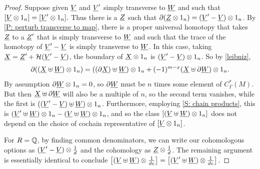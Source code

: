 \begin{proof}
	Suppose given $\underline{V}$ and $\underline{V}'$ simply transverse to $\underline{W}$ and such that $[\underline{V} \otimes 1_n] = [\underline{V}' \otimes 1_n].$
	Thus there is a $\underline{Z}$ such that $\partial (\underline{Z} \otimes 1_n)= (\underline{V}'-\underline{V})\otimes 1_n$.
	By \cref{P: perturb transverse to map}, there is a proper universal homotopy that takes $\underline{Z}$ to a $\underline{Z}'$ that is simply transverse to $\underline{W}$ and such that the trace of the homotopy of $\underline{V}'-\underline{V}$ is simply transverse to $\underline{W}$.
	In this case, taking $\underline{X} = \underline{Z}' + \mathcal{H}(\underline{V}'-\underline{V})$, the boundary of $\underline{X} \otimes 1_n$ is $(\underline{V}'-\underline{V}) \otimes 1_n$.
	So by \cref{leibniz},
	$$\partial ((\underline{X} \uplus \underline{W})\otimes 1_n) = ((\partial \underline{X}) \uplus \underline{W})\otimes 1_n +(-1)^{m-x}(\underline{X} \uplus \partial \underline{W})\otimes 1_n.$$
	By assumption $\partial \underline{W} \otimes 1_n = 0$, so $\partial \underline{W}$ must be $n$ times some element of $C^*_\Gamma(M)$.
	But then $\underline{X} \uplus \partial \underline{W}$ will also be a multiple of $n$, so the second term vanishes, while the first is $((\underline{V}'-\underline{V})\uplus \underline{W}) \otimes 1_n$.
	Furthermore, employing \cref{S: chain products}, this is $(\underline{V}' \uplus \underline{W})\otimes 1_n - (\underline{V} \uplus \underline{W}) \otimes 1_n$, and so the class $[(\underline{V} \uplus \underline{W})\otimes 1_n]$ does not depend on the choice of cochain representative of $[\underline{V} \otimes 1_n]$.

	For $R=\mathbb{Q}$, by finding common denominators, we can write our cohomologous options as $(\underline{V}'-\underline{V})\otimes \frac{1}{d}$ and the cohomology as $\underline{Z} \otimes \frac{1}{d}$.
	The remaining argument is essentially identical to conclude $\left[(\underline{V} \uplus \underline{W})\otimes \frac{1}{de}\right] = \left[(\underline{V}' \uplus \underline{W})\otimes \frac{1}{de}\right]$.
\end{proof}

